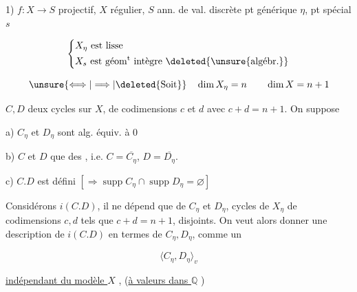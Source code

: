 1) $f:X\longrightarrow S$ projectif, $X$ régulier,
$S$  ann. de val. discrète
pt générique $\eta$, pt spécial $s$

\[
\left\{\begin{aligned}
&X_\eta \text{ est lisse}\\
&X_s \text{ est géom\textsuperscript{t} intègre }\deleted{\unsure{\text{algébr.}}}
\end{aligned}\right.
\]

\[
 \unsure{\Longleftrightarrow|\Longrightarrow|\text{\deleted{Soit}}}\quad\dim X_\eta=n\qquad\dim X=n+1
\]

$C,D$ deux cycles sur $X$, de codimensions
$c$ et $d$ avec $c+d=n+1$. On suppose

a)  $C_\eta$ et $D_\eta$ sont alg. équiv. à $0$

b) $C$ et $D$  que des  ,
i.e. $C=\overline{C_\eta}$, $D=\overline{D_\eta}$.

c) $C.D$ est défini $[\Longrightarrow\operatorname{supp}C_\eta\cap\operatorname{supp}D_\eta=\varnothing]$

Considérons $i(C.D)$, il ne dépend que de
$C_\eta$ et $D_\eta$, cycles  de $X_\eta$  de codimensions
$c,d$ tels que $c+d=n+1$,  
disjoints. On veut alors donner une
description de $i(C.D)$ en termes
de $C_\eta,D_\eta$, comme un

\[
 \langle C_\eta,D_\eta\rangle_v
\]

\uline{indépendant du modèle $X$} ,
(\uline{à valeurs dans $\mathbb Q$} )

